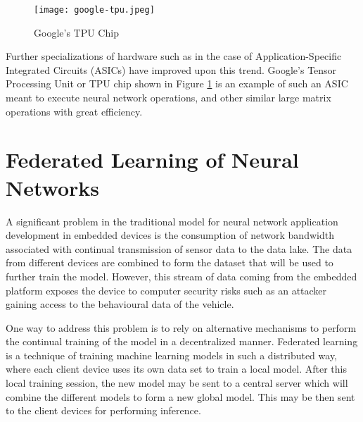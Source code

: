\begin{figure}[h]
	\centering
	\texttt{[image: google-tpu.jpeg]}
	\caption{Google's TPU Chip}
	\label{fig:google-tpu}
\end{figure}

Further specializations of hardware such as in the case of Application-Specific Integrated Circuits (ASICs) have improved upon this trend. Google's Tensor Processing Unit or TPU chip shown in Figure \ref{fig:google-tpu} is an example of such an ASIC meant to execute neural network operations, and other similar large matrix operations with great efficiency.

\section{Federated Learning of Neural Networks}

A significant problem in the traditional model for neural network application development in embedded devices is the consumption of network bandwidth associated with continual transmission of sensor data to the data lake. The data from different devices are combined to form the dataset that will be used to further train the model. However, this stream of data coming from the embedded platform exposes the device to computer security risks such as an attacker gaining access to the behavioural data of the vehicle.

\begin{figure}[h]
	\centering
\end{figure}

One way to address this problem is to rely on alternative mechanisms to perform the continual training of the model in a decentralized manner. Federated learning is a technique of training machine learning models in such a distributed way, where each client device uses its own data set to train a local model. After this local training session, the new model may be sent to a central server which will combine the different models to form a new global model. This may be then sent to the client devices for performing inference.

